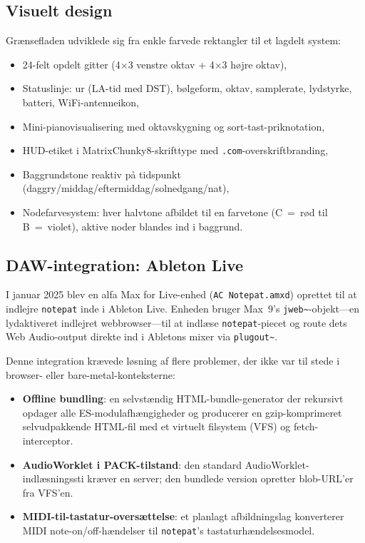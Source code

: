 \documentclass[10pt,letterpaper,twocolumn]{article}
\begin{document}
\subsection{Visuelt design}

Grænsefladen udviklede sig fra enkle farvede rektangler til et lagdelt system:

\begin{itemize}
  \item 24-felt opdelt gitter (4$\times$3 venstre oktav + 4$\times$3 højre oktav),
  \item Statuslinje: ur (LA-tid med DST), bølgeform, oktav, samplerate, lydstyrke, batteri, WiFi-antenneikon,
  \item Mini-pianovisualisering med oktavskygning og sort-tast-priknotation,
  \item HUD-etiket i MatrixChunky8-skrifttype med \texttt{.com}-overskriftbranding,
  \item Baggrundstone reaktiv på tidspunkt (daggry/middag/eftermiddag/solnedgang/nat),
  \item Nodefarvesystem: hver halvtone afbildet til en farvetone (C~=~rød til B~=~violet), aktive noder blandes ind i baggrund.
\end{itemize}

\subsection{DAW-integration: Ableton Live}

I januar 2025 blev en alfa Max for Live-enhed (\texttt{AC Notepat.amxd}) oprettet til at indlejre \texttt{notepat} inde i Ableton Live. Enheden bruger Max~9's \texttt{jweb\textasciitilde}-objekt---en lydaktiveret indlejret webbrowser---til at indlæse \texttt{notepat}-piecet og route dets Web Audio-output direkte ind i Abletons mixer via \texttt{plugout\textasciitilde}.

Denne integration krævede løsning af flere problemer, der ikke var til stede i browser- eller bare-metal-konteksterne:

\begin{itemize}
  \item \textbf{Offline bundling}: en selvstændig HTML-bundle-generator der rekursivt opdager alle ES-modulafhængigheder og producerer en gzip-komprimeret selvudpakkende HTML-fil med et virtuelt filsystem (VFS) og fetch-interceptor.
  \item \textbf{AudioWorklet i PACK-tilstand}: den standard AudioWorklet-indlæsningssti kræver en server; den bundlede version opretter blob-URL'er fra VFS'en.
  \item \textbf{MIDI-til-tastatur-oversættelse}: et planlagt afbildningslag konverterer MIDI note-on/off-hændelser til \texttt{notepat}'s tastaturhændelsesmodel.
\end{itemize}
\end{document}
